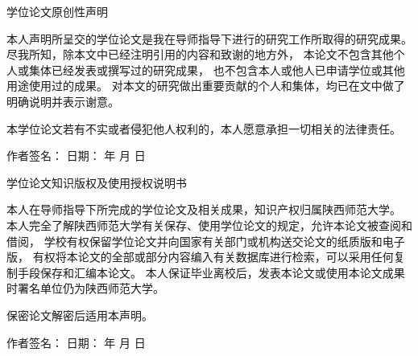 
{
    \renewcommand{\baselinestretch}{1.45} %
    \setlength{\parindent}{2em} %
    {
        {\centering \heiti {} 学位论文原创性声明\par}    %
        \vspace{21pt}
        本人声明所呈交的学位论文是我在导师指导下进行的研究工作所取得的研究成果。
        尽我所知，除本文中已经注明引用的内容和致谢的地方外，
        本论文不包含其他个人或集体已经发表或撰写过的研究成果，
        也不包含本人或他人已申请学位或其他用途使用过的成果。
        对本文的研究做出重要贡献的个人和集体，均已在文中做了明确说明并表示谢意。

        本学位论文若有不实或者侵犯他人权利的，本人愿意承担一切相关的法律责任。
        \vspace{1cm}
        \begin{center}
            \hspace*{2em}作者签名：\underline{\makebox[5em][c]{}} \hfill
            日期：
            \underline{\makebox[3em][c]{}} 年
            \underline{\makebox[1.5em][c]{}} 月
            \underline{\makebox[1.5em][c]{}} 日
        \end{center}
    }

    \vspace{2.5cm}
    {
        {\centering \heiti {}  学位论文知识版权及使用授权说明书\par}
        \vspace{21pt}
        本人在导师指导下所完成的学位论文及相关成果，知识产权归属陕西师范大学。
        本人完全了解陕西师范大学有关保存、使用学位论文的规定，允许本论文被查阅和借阅，
        学校有权保留学位论文并向国家有关部门或机构送交论文的纸质版和电子版，
        有权将本论文的全部或部分内容编入有关数据库进行检索，可以采用任何复制手段保存和汇编本论文。
        本人保证毕业离校后，发表本论文或使用本论文成果时署名单位仍为陕西师范大学。

        保密论文解密后适用本声明。
        \vspace{1cm}
        \begin{center}
            \hspace*{2em}作者签名：\underline{\makebox[5em][c]{}} \hfill
            日期：
            \underline{\makebox[3em][c]{}} 年
            \underline{\makebox[1.5em][c]{}} 月
            \underline{\makebox[1.5em][c]{}} 日
        \end{center}
    }
}
\clearpage
\hbox{}
\clearpage